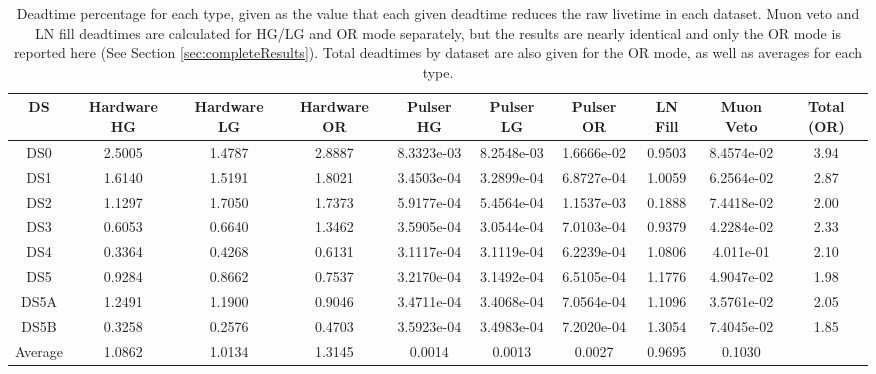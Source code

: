 \documentclass[notitlepage,rmp,aps,10pt]{revtex4-1}
\begin{document}
\begin{table*}[htb]
\begin{center}
\begin{tabular}{|c|c|c|c|c|c|c|c|c|c|}
\hline
DS & Hardware HG & Hardware LG & Hardware OR & Pulser HG & Pulser LG & Pulser OR & LN Fill & Muon Veto & Total (OR)\\
\hline
DS0 & 2.5005     & 1.4787     & 2.8887     & 8.3323e-03 & 8.2548e-03 & 1.6666e-02 & 0.9503  & 8.4574e-02 & 3.94 \\
DS1 & 1.6140     & 1.5191     & 1.8021     & 3.4503e-04 & 3.2899e-04 & 6.8727e-04 & 1.0059  & 6.2564e-02 & 2.87 \\
DS2 & 1.1297     & 1.7050     & 1.7373     & 5.9177e-04 & 5.4564e-04 & 1.1537e-03 & 0.1888  & 7.4418e-02 & 2.00 \\
DS3 & 0.6053     & 0.6640     & 1.3462     & 3.5905e-04 & 3.0544e-04 & 7.0103e-04 & 0.9379  & 4.2284e-02 & 2.33 \\
DS4 & 0.3364     & 0.4268     & 0.6131     & 3.1117e-04 & 3.1119e-04 & 6.2239e-04 & 1.0806  & 4.011e-01 & 2.10 \\
DS5 & 0.9284     & 0.8662     & 0.7537     & 3.2170e-04 & 3.1492e-04 & 6.5105e-04 & 1.1776  & 4.9047e-02 & 1.98 \\
DS5A & 1.2491    & 1.1900     & 0.9046     & 3.4711e-04 & 3.4068e-04 & 7.0564e-04 & 1.1096  & 3.5761e-02 & 2.05 \\
DS5B & 0.3258    & 0.2576     & 0.4703     & 3.5923e-04 & 3.4983e-04 & 7.2020e-04 & 1.3054  & 7.4045e-02 & 1.85 \\
\hline
Average & 1.0862 & 1.0134 & 1.3145 & 0.0014 & 0.0013 & 0.0027 & 0.9695 & 0.1030  &\\
\hline
\end{tabular}
\caption{Deadtime percentage for each type, given as the value that each given deadtime reduces the raw livetime in each dataset.  Muon veto and LN fill deadtimes are calculated for HG/LG and OR mode separately, but the results are nearly identical and only the OR mode is reported here (See Section \ref{sec:completeResults}). Total deadtimes by dataset are also given for the OR mode, as well as averages for each type.}
\label{tab:DeadtimeFrac}
\end{center}
\end{table*}
\end{document}
